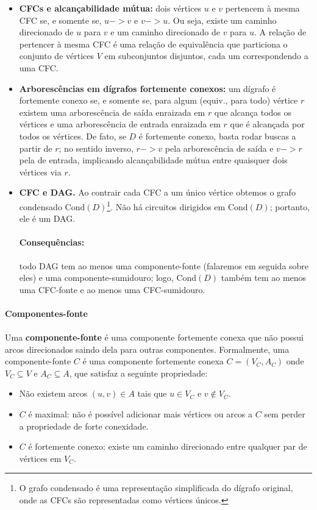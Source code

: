 \documentclass[12pt,a4paper]{article}
\def\emph#1{#1}%
\def\leadsto{->}%
\begin{document}
\begin{itemize}
    \item \textbf{CFCs e alcançabilidade mútua:} dois vértices \(u\) e \(v\) pertencem à mesma CFC se, e somente se, \(u\leadsto v\) e \(v\leadsto u\). Ou seja, existe um caminho direcionado de \(u\) para \(v\) e um caminho direcionado de \(v\) para \(u\). A relação de pertencer à mesma CFC é uma relação de equivalência que particiona o conjunto de vértices \(V\) em subconjuntos disjuntos, cada um correspondendo a uma CFC.
    \item \textbf{Arborescências em dígrafos fortemente conexos:} um dígrafo é fortemente conexo se, e somente se, para algum (equiv., para todo) vértice $r$ existem uma \emph{arborescência de saída} enraizada em $r$ que alcança todos os vértices e uma \emph{arborescência de entrada} enraizada em $r$ que é alcançada por todos os vértices. De fato, se $D$ é fortemente conexo, basta rodar buscas a partir de $r$; no sentido inverso, $r\leadsto v$ pela arborescência de saída e $v\leadsto r$ pela de entrada, implicando alcançabilidade mútua entre quaisquer dois vértices via $r$.
    \item \textbf{CFC e DAG.} Ao \emph{contrair} cada CFC a um único vértice obtemos o grafo condensado $\mathrm{Cond}(D)$\footnote{O grafo condensado é uma representação simplificada do dígrafo original, onde as CFCs são representadas como vértices únicos.}. Não há circuitos dirigidos em $\mathrm{Cond}(D)$; portanto, ele é um DAG.
    
    \paragraph{Consequências:}
     todo DAG tem ao menos uma componente-fonte (falaremos em seguida sobre eles) e uma componente-sumidouro; logo, $\mathrm{Cond}(D)$ também tem ao menos uma CFC-fonte e ao menos uma CFC-sumidouro.
\end{itemize}

\paragraph{Componentes-fonte}
\paragraph{}Uma \textbf{componente-fonte} é uma componente fortemente conexa que não possui arcos direcionados saindo dela para outras componentes. Formalmente, uma componente-fonte \(C\) é uma componente fortemente conexa \(C = (V_C, A_C)\) onde \(V_C \subseteq V\) e \(A_C \subseteq A\), que satisfaz a seguinte propriedade:
\begin{itemize}
    \item Não existem arcos \((u, v) \in A\) tais que \(u \in V_C\) e \(v \notin V_C\).
    \item \(C\) é maximal: não é possível adicionar mais vértices ou arcos a \(C\) sem perder a propriedade de forte conexidade.
    \item \(C\) é fortemente conexo: existe um caminho direcionado entre qualquer par de vértices em \(V_C\).
\end{itemize}
\end{document}
